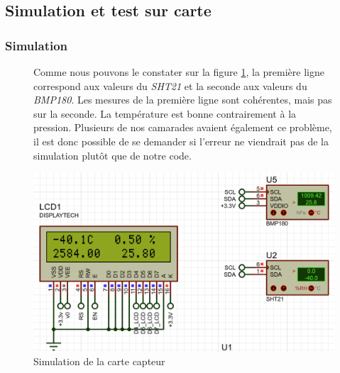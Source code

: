         \subsection{Simulation et test sur carte}
            \subsubsection{Simulation}

                \begin{figure}[!h]
                    \centering
                    \begin{minipage}{.48\linewidth}
                        Comme nous pouvons le constater sur la figure \ref{fig:simu_sensor}, la première ligne correspond aux valeurs du \textit{SHT21} et la seconde aux valeurs du \textit{BMP180}. Les mesures de la première ligne sont cohérentes, mais pas sur la seconde. 
                        La température est bonne contrairement à la pression. Plusieurs de nos camarades avaient également ce problème, il est donc possible de se demander si l'erreur ne viendrait pas de la simulation plutôt que de notre code.
                    \end{minipage}\hfill
                    \begin{minipage}{.48\linewidth}
                        \begin{center}
                            \begin{center}
                                \includegraphics[width=1\textwidth]{img/code/simu_sensor.png}
                                \caption{\label{fig:simu_sensor}Simulation de la carte capteur}  
                            \end{center}
                        \end{center}
                    \end{minipage}
                \end{figure}
            


